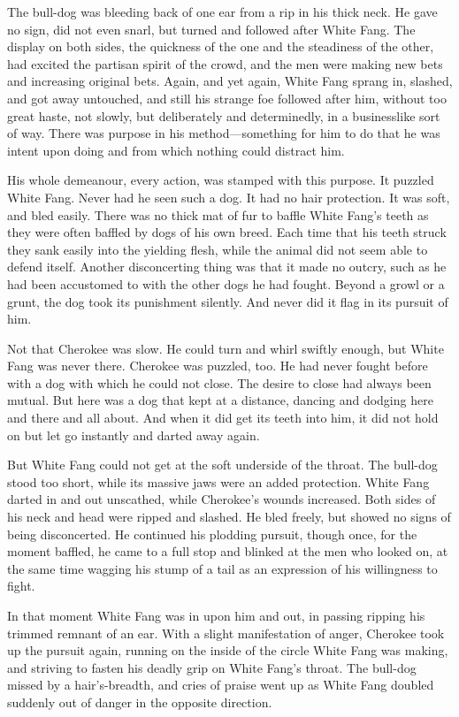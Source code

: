 \documentclass[10pt]{book}
\begin{document}
The bull-dog was bleeding back of one ear from a rip in his thick neck.
He gave no sign, did not even snarl, but turned and followed after
White Fang. The display on both sides, the quickness of the one and the
steadiness of the other, had excited the partisan spirit of the crowd,
and the men were making new bets and increasing original bets. Again,
and yet again, White Fang sprang in, slashed, and got away untouched,
and still his strange foe followed after him, without too great haste,
not slowly, but deliberately and determinedly, in a businesslike sort
of way. There was purpose in his method—something for him to do that he
was intent upon doing and from which nothing could distract him.

His whole demeanour, every action, was stamped with this purpose. It
puzzled White Fang. Never had he seen such a dog. It had no hair
protection. It was soft, and bled easily. There was no thick mat of fur
to baffle White Fang’s teeth as they were often baffled by dogs of his
own breed. Each time that his teeth struck they sank easily into the
yielding flesh, while the animal did not seem able to defend itself.
Another disconcerting thing was that it made no outcry, such as he had
been accustomed to with the other dogs he had fought. Beyond a growl or
a grunt, the dog took its punishment silently. And never did it flag in
its pursuit of him.

Not that Cherokee was slow. He could turn and whirl swiftly enough, but
White Fang was never there. Cherokee was puzzled, too. He had never
fought before with a dog with which he could not close. The desire to
close had always been mutual. But here was a dog that kept at a
distance, dancing and dodging here and there and all about. And when it
did get its teeth into him, it did not hold on but let go instantly and
darted away again.

But White Fang could not get at the soft underside of the throat. The
bull-dog stood too short, while its massive jaws were an added
protection. White Fang darted in and out unscathed, while Cherokee’s
wounds increased. Both sides of his neck and head were ripped and
slashed. He bled freely, but showed no signs of being disconcerted. He
continued his plodding pursuit, though once, for the moment baffled, he
came to a full stop and blinked at the men who looked on, at the same
time wagging his stump of a tail as an expression of his willingness to
fight.

In that moment White Fang was in upon him and out, in passing ripping
his trimmed remnant of an ear. With a slight manifestation of anger,
Cherokee took up the pursuit again, running on the inside of the circle
White Fang was making, and striving to fasten his deadly grip on White
Fang’s throat. The bull-dog missed by a hair’s-breadth, and cries of
praise went up as White Fang doubled suddenly out of danger in the
opposite direction.
\end{document}
